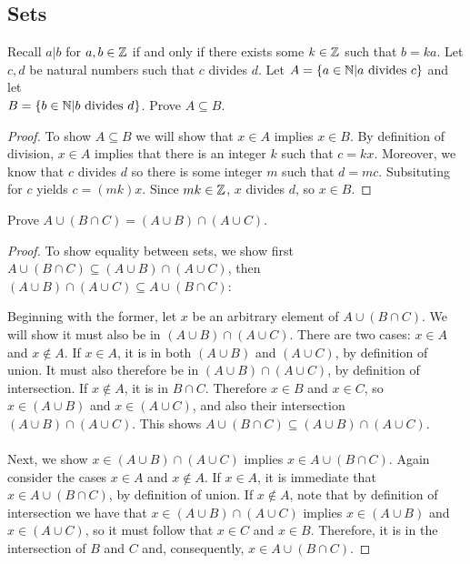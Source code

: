 \documentclass[]{exam}
\begin{document}
\begin{questions}
\subsection*{Sets}
Recall $a|b$ for $a,b \in \mathbb{Z}$ if and only if there exists some $k \in \mathbb{Z}$ such that $b = ka$.
\question Let $c, d$ be natural numbers such that $c$ divides $d$.
   Let $A = \{a \in \mathbb{N}| a \text{ divides } c \}$ and let\\ 
   $B = \{b \in \mathbb{N}| b\text{ divides }d \}$. Prove $A \subseteq B$.

\begin{solution}
\begin{proof}
To show $A \subseteq B$ we will show that $x \in A$ implies $x \in B$.
By definition of division, $x \in A$ implies that there is an integer
$k$ such that $c = kx$. Moreover, we know that $c$ divides $d$ so
there is some integer $m$ such that $d = mc$. Subsituting for
$c$ yields $c = (mk)x$. Since $mk \in \mathbb{Z}$, $x$ divides $d$, so $x \in B$.
\end{proof}
\end{solution}


\question
Prove $A \cup (B \cap C) = (A \cup B) \cap (A \cup C)$.
\begin{solution}
\begin{proof}
To show equality between sets, we show first $A \cup (B \cap C) \subseteq (A
    \cup B) \cap (A \cup C)$, then 
$(A \cup B) \cap (A \cup C) \subseteq A \cup (B \cap C)$:

Beginning with the former, let $x$ be an arbitrary element of 
$A \cup (B \cap C)$. We will show it must also be in $(A \cup B) \cap (A \cup C)$. 
There are two cases: $x \in A$ and $x \notin A$. If $x \in A$, it is in both
 $(A \cup B)$ and $(A \cup C)$, by definition of union. It must also therefore
 be in $(A \cup B) \cap (A \cup C)$, by definition of intersection. If $x \notin A$, 
 it is in $B \cap C$. Therefore $x \in B$ and $x \in C$, so $x \in (A \cup B)$ and 
 $x \in (A \cup C)$, and also their intersection $(A \cup B) \cap (A \cup C)$.
This shows $A \cup (B \cap C) \subseteq (A \cup B) \cap (A \cup C)$.
\\~\\
Next, we show $x \in (A \cup B) \cap (A \cup C)$ implies 
$x \in A \cup (B \cap C)$. Again consider the cases $x \in A$ and $x \notin A$.
If $x \in A$, it is immediate that $x \in A \cup (B \cap C)$, by definition
of union. If $x \notin A$, note that by definition of intersection we have that
$x \in (A \cup B) \cap (A \cup C)$ implies $x \in (A \cup B)$ and $x \in (A \cup C)$,
so it must follow that $x \in C$ and $x \in B$. Therefore, it is in the
intersection of $B$ and $C$ and, consequently, $x \in A \cup (B \cap C)$.


\end{proof}
\end{solution}
\end{questions}
\end{document}
